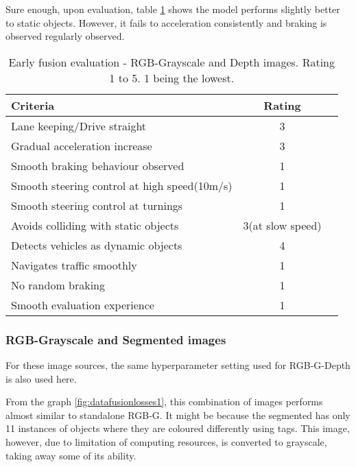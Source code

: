 Sure enough, upon evaluation, table \ref{table:earlyfusionrgbdepth} shows the model
performs slightly better to static objects. However, it fails to acceleration consistently
and braking is observed regularly observed.
\begin{table}[!ht]
    \centering
\begin{tabular}{lcc}
    \toprule
    Criteria & Rating \\\midrule
    Lane keeping/Drive straight  & 3  \\
    Gradual acceleration increase  & 3\\
    Smooth braking behaviour observed & 1 \\
    Smooth steering control at high speed(10m/s) & 1 \\
    Smooth steering control at turnings & 1\\
    Avoids colliding with static objects & 3(at slow speed) \\
    Detects vehicles as dynamic objects & 4 \\
    Navigates traffic smoothly & 1\\
    No random braking & 1 \\
    Smooth evaluation experience & 1 \\\bottomrule
\end{tabular}
\caption{Early fusion evaluation - RGB-Grayscale and Depth images. Rating 1 to 5. 1 being
the lowest.}
\label{table:earlyfusionrgbdepth}
\end{table}


\subsubsection*{RGB-Grayscale and Segmented images}
For these image sources, the same hyperparameter setting used for RGB-G-Depth is also used
here.

From the graph \ref{fig:datafusionlosses1}, this combination of images performs almost
similar to standalone RGB-G. It might be because the segmented has only 11 instances of
objects where they are coloured differently using tags. This image, however, due to
limitation of computing resources, is converted to grayscale, taking away some of its
ability.

